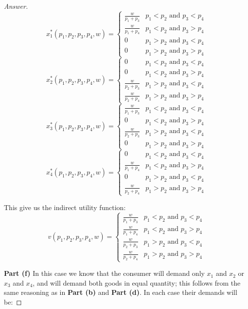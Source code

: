 \documentclass{article}
\theoremstyle{definition}
\begin{document}
\begin{proof}[Answer]
$$x_1^*(p_1,p_2,p_3,p_4,w) = \left \{ \begin{array}{cc}
     \frac{w}{p_1+p_3}&  p_1 < p_2 \text{ and } p_3 < p_4\\
     \frac{w}{p_1+p_4}&  p_1 < p_2 \text{ and } p_3 > p_4\\
     0&  p_1 > p_2 \text{ and } p_3 < p_4\\
     0&  p_1 > p_2 \text{ and } p_3 > p_4
\end{array}$$
$$ x_2^*(p_1,p_2,p_3,p_4,w) = \left \{ \begin{array}{cc}
     0&  p_1 < p_2 \text{ and } p_3 < p_4\\
     0&  p_1 < p_2 \text{ and } p_3 > p_4\\
     \frac{w}{p_2+p_3}& p_1 > p_2 \text{ and } p_3 < p_4\\
     \frac{w}{p_2+p_4}&  p_1 > p_2 \text{ and } p_3 > p_4
\end{array}$$
$$x_3^*(p_1,p_2,p_3,p_4,w) = \left \{ \begin{array}{cc}
     \frac{w}{p_1+p_3}&  p_1 < p_2 \text{ and } p_3 < p_4\\
     0&  p_1 < p_2 \text{ and } p_3 > p_4\\
     \frac{w}{p_2+p_3}&  p_1 > p_2 \text{ and } p_3 < p_4\\
     0&  p_1 > p_2 \text{ and } p_3 > p_4
\end{array}$$
$$ x_4^*(p_1,p_2,p_3,p_4,w) = \left \{ \begin{array}{cc}
     0&  p_1 < p_2 \text{ and } p_3 < p_4\\
     \frac{w}{p_1+p_4}&  p_1 < p_2 \text{ and } p_3 > p_4\\
     0 & p_1 > p_2 \text{ and } p_3 < p_4\\
     \frac{w}{p_2+p_4}&  p_1 > p_2 \text{ and } p_3 > p_4
\end{array}$$

This give us the indirect utility function:
$$v(p_1,p_2,p_3,p_4,w) = \left \{ \begin{array}{cc}
      \frac{w}{p_1+p_3}&  p_1 < p_2 \text{ and } p_3 < p_4\\
     \frac{w}{p_1+p_4}&  p_1 < p_2 \text{ and } p_3 > p_4\\
      \frac{w}{p_2+p_3} & p_1 > p_2 \text{ and } p_3 < p_4\\
     \frac{w}{p_2+p_4}&  p_1 > p_2 \text{ and } p_3 > p_4
\end{array}$$

\textbf{Part (f)}
In this case we know that the consumer will demand only $x_1$ and $x_2$ or $x_3$ and $x_4$, and will demand both goods in equal quantity; this follows from the same reasoning as in \textbf{Part (b)} and \textbf{Part (d)}. In each case their demands will be:


\end{proof}
\end{document}
